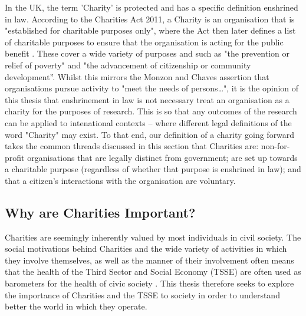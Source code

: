 In the UK, the term 'Charity' is protected and has a specific definition enshrined in law. According to the Charities Act 2011, a Charity is an organisation that is "established for charitable purposes only", where the Act then later defines a list of charitable purposes to ensure that the organisation is acting for the public benefit \cite{noauthor_charities_2011}. These cover a wide variety of purposes and such as "the prevention or relief of poverty" and "the advancement of citizenship or community development''. Whilst this mirrors the Monzon and Chaves assertion that organisations pursue activity to "meet the needs of persons…", it is the opinion of this thesis that enshrinement in law is not necessary treat an organisation as a charity for the purposes of research. This is so that any outcomes of the research can be applied to intenational contexts -- where different legal definitions of the word "Charity" may exist. To that end, our definition of a charity going forward takes the common threads discussed in this section that Charities are: non-for-profit organisations that are legally distinct from government; are set up towards a charitable purpose (regardless of whether that purpose is enshrined in law); and that a citizen's interactions with the organisation are voluntary.


\subsection{Why are Charities Important?}
Charities are seemingly inherently valued by most individuals in civil society. The social motivations behind Charities and the wide variety of activities in which they involve themselves, as well as the manner of their involvement often means that the health of the Third Sector and Social Economy (TSSE) are often used as barometers for the health of civic society \cite{moulaert_social_2005}. This thesis therefore seeks to explore the importance of Charities and the TSSE to society in order to understand better the world in which they operate.

